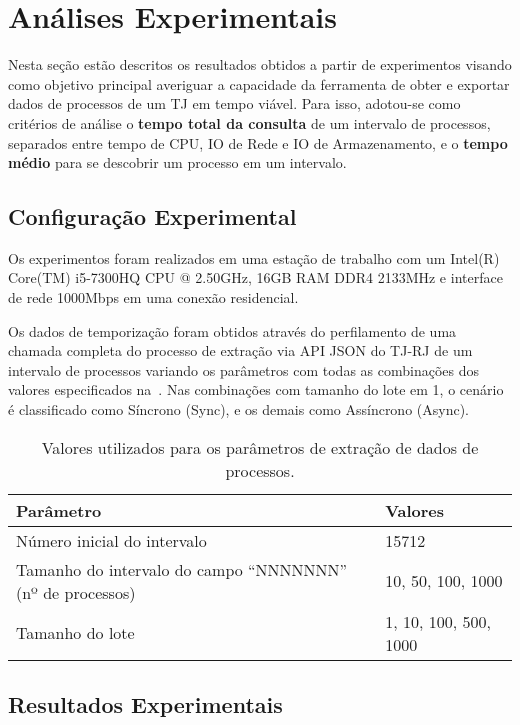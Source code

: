 \chapter{Análises Experimentais~\label{chp:Resultados-Experimentais}}

Nesta seção estão descritos os resultados obtidos a partir de experimentos
visando como objetivo principal averiguar a capacidade da ferramenta de obter e
exportar dados de processos de um TJ em tempo viável. Para isso, adotou-se como
critérios de análise o \textbf{tempo total da consulta} de
um intervalo de processos, separados entre tempo de CPU, IO de Rede e IO de
Armazenamento, e o \textbf{tempo médio} para se descobrir um processo em um
intervalo.

\section{Configuração Experimental~\label{sec:Configuração-Experimental}}

Os experimentos foram realizados em uma estação de trabalho com um Intel(R)
Core(TM) i5-7300HQ CPU @ 2.50GHz, 16GB RAM DDR4 2133MHz e interface de rede
1000Mbps em uma conexão residencial.

Os dados de temporização foram obtidos através do perfilamento de uma chamada
completa do processo de extração via API JSON do TJ-RJ de um intervalo de
processos variando os parâmetros com todas as combinações dos valores
especificados na~. Nas combinações com
tamanho do lote em 1, o cenário é classificado como Síncrono (Sync), e os
demais como Assíncrono (Async).

\begin{table}[htb]
  \centering
  \begin{tabular}{ll}
    \toprule
    Parâmetro & Valores \\
    \midrule
    Número inicial do intervalo & 15712 \\
    Tamanho do intervalo do campo ``NNNNNNN'' (nº de processos) & 10, 50, 100, 1000 \\
    Tamanho do lote & 1, 10, 100, 500, 1000 \\
    \bottomrule
  \end{tabular}
  \caption{%
    Valores utilizados para os parâmetros de extração de dados de processos.
  }
  \label{tbl:parâmetros-de-perfilamento}
\end{table}

\section{Resultados Experimentais}

